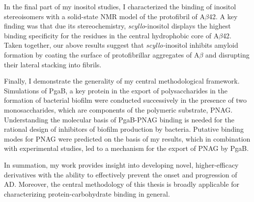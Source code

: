 In the final part of my inositol studies, I characterized the binding of inositol stereoisomers with a solid-state NMR model of the protofibril of A$\beta$42. A key finding was that due its stereochemistry, \textit{scyllo}-inositol displays the highest binding specificity for the residues in the central hydrophobic core of A$\beta$42. Taken together, our above results suggest that \textit{scyllo-}inositol inhibits amyloid formation by coating the surface of protofibrillar aggregates of A$\beta$ and disrupting their lateral stacking into fibrils.

Finally, I demonstrate the generality of my central methodological framework. Simulations of PgaB, a key protein in the export of polysaccharides in the formation of bacterial biofilm were conducted successively in the presence of two monosaccharides, which are components of the polymeric substrate, PNAG.   Understanding the molecular basis of PgaB-PNAG binding is needed for the rational design of inhibitors of biofilm production by bacteria.   Putative binding modes for PNAG were predicted on the basis of my results, which in combination with experimental studies, led to a mechanism for the export of PNAG by PgaB.

In summation, my work provides insight into developing novel, higher-efficacy derivatives with the ability to effectively prevent the onset and progression of AD.  Moreover, the central methodology of this thesis is broadly applicable for characterizing protein-carbohydrate binding in general.





